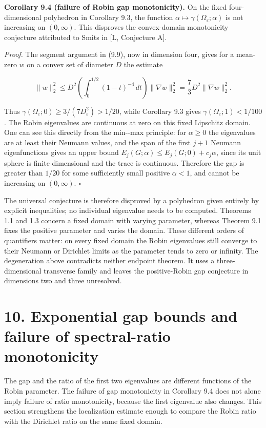 \documentclass[11pt]{article}
\begin{document}
\textbf{Corollary 9.4 (failure of Robin gap monotonicity).} On the fixed
four-dimensional polyhedron in Corollary 9.3, the function
\(\alpha\mapsto\gamma(\Omega_\varepsilon;\alpha)\) is not increasing on
\((0,\infty)\). This disproves the convex-domain monotonicity conjecture
attributed to Smits in {[}L, Conjecture A{]}.

\emph{Proof.} The segment argument in (9.9), now in dimension four,
gives for a mean-zero \(w\) on a convex set of diameter \(D\) the
estimate

\[
\|w\|_2^2\le D^2\left(\int_0^{1/2}(1-t)^{-4}\,dt\right)\|\nabla w\|_2^2
=\frac73D^2\|\nabla w\|_2^2.
\tag{9.27}
\]

Thus \(\gamma(\Omega_\varepsilon;0)\ge3/(7D_\varepsilon^2)>1/20\), while
Corollary 9.3 gives \(\gamma(\Omega_\varepsilon;1)<1/100\). The Robin
eigenvalues are continuous at zero on this fixed Lipschitz domain. One
can see this directly from the min-\/-max principle: for \(\alpha\ge0\)
the eigenvalues are at least their Neumann values, and the span of the
first \(j+1\) Neumann eigenfunctions gives an upper bound
\(E_j(G;\alpha)\le E_j(G;0)+c_j\alpha\), since its unit sphere is finite
dimensional and the trace is continuous. Therefore the gap is greater
than \(1/20\) for some sufficiently small positive \(\alpha<1\), and
cannot be increasing on \((0,\infty)\). \(\square\)

The universal conjecture is therefore disproved by a polyhedron given
entirely by explicit inequalities; no individual eigenvalue needs to be
computed. Theorems 1.1 and 1.3 concern a fixed domain with varying
parameter, whereas Theorem 9.1 fixes the positive parameter and varies
the domain. These different orders of quantifiers matter: on every fixed
domain the Robin eigenvalues still converge to their Neumann or
Dirichlet limits as the parameter tends to zero or infinity. The
degeneration above contradicts neither endpoint theorem. It uses a
three-dimensional transverse family and leaves the positive-Robin gap
conjecture in dimensions two and three unresolved.

\section{10. Exponential gap bounds and failure of spectral-ratio
monotonicity}\label{exponential-gap-bounds-and-failure-of-spectral-ratio-monotonicity}

The gap and the ratio of the first two eigenvalues are different
functions of the Robin parameter. The failure of gap monotonicity in
Corollary 9.4 does not alone imply failure of ratio monotonicity,
because the first eigenvalue also changes. This section strengthens the
localization estimate enough to compare the Robin ratio with the
Dirichlet ratio on the same fixed domain.
\end{document}
